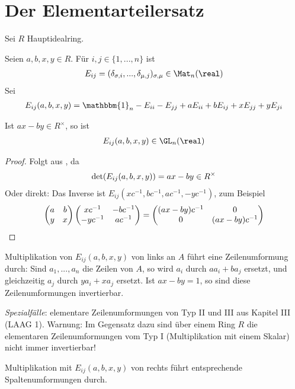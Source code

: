 \section{Der Elementarteilersatz}

Sei $R$ Hauptidealring.

\begin{definition}
	Seien $a,b,x,y\in R$. Für $i,j\in\{1,...,n\}$ ist
	\begin{align}
		E_{ij} = (\delta_{\sigma,i},...,\delta_{\mu,j})_{\sigma,\mu}\in\Mat_n(\real)\notag
	\end{align}
	Sei
	\begin{align}
		E_{ij}(a,b,x,y) = \mathbbm{1}_n-E_{ii}-E_{jj}+aE_{ii}+bE_{ij}+xE_{jj}+yE_{ji}\notag
	\end{align}
\end{definition}

\begin{lemma}
	Ist $ax-by\in R^\times$, so ist
	\begin{align}
		E_{ij}(a,b,x,y)\in \GL_n(\real)\notag
	\end{align}
\end{lemma}
\begin{proof}
	Folgt aus , da
	\begin{align}
		\det(E_{ij}(a,b,x,y))=ax-by\in R^\times\notag
	\end{align}
	Oder direkt: Das Inverse ist $E_{ij}(xc^{-1},bc^{-1}, ac^{-1},-yc^{-1})$, zum Beispiel
	\begin{align}
		\begin{pmatrix} a & b \\ y & x\end{pmatrix}\begin{pmatrix}xc^{-1} & -bc^{-1} \\ -yc^{-1} & ac^{-1}\end{pmatrix}=\begin{pmatrix}(ax-by)c^{-1} & 0 \\ 0 & (ax-by)c^{-1}\end{pmatrix}\notag
	\end{align}
\end{proof}

\begin{remark}
	Multiplikation von $E_{ij}(a,b,x,y)$ von links an $A$ führt eine Zeilenumformung durch: Sind $a_1,...,a_n$ die Zeilen von $A$, so wird $a_i$ durch $aa_i+ba_j$ ersetzt, und gleichzeitig $a_j$ durch $ya_i+xa_j$ ersetzt. Ist $ax-by=1$, so sind diese Zeilenumformungen invertierbar.
	
	\emph{Spezialfälle}: elementare Zeilenumformungen von Typ II und III aus Kapitel III (LAAG 1). Warnung: Im Gegensatz dazu sind über einem Ring $R$ die elementaren Zeilenumformungen vom Typ I (Multiplikation mit einem Skalar) nicht immer invertierbar!
	
	Multiplikation mit $E_{ij}(a,b,x,y)$ von rechts führt entsprechende Spaltenumformungen durch.
\end{remark}

